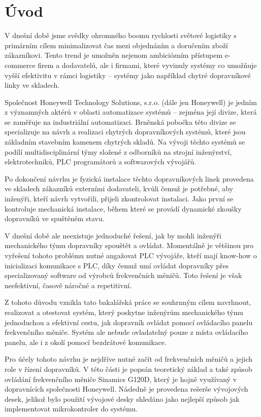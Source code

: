 \chapter*{Úvod}\label{chap:uvod}

V dnešní době jsme svědky ohromného boomu rychlosti světové logistiky s primárním cílem minimalizovat čas mezi objednáním a doručením zboží zákazníkovi. Tento trend je umožněn nejenom ambiciózním přístupem e-commerce firem a dodavatelů, ale i firmami, které vyvinuly systémy co umožňuje vyšší efektivitu v rámci logistiky – systémy jako například chytré dopravníkové linky ve skladech.

Společnost Honeywell Technology Solutions, s.r.o. (dále jen Honeywell) je jedním z významných aktérů v oblasti automatizace systémů – zejména její divize, která se zaměřuje na industriální automatizaci. Brněnská pobočka této divize se specializuje na návrh a realizaci chytrých dopravníkových systémů, které jsou základním stavebním kamenem chytrých skladů. Na vývoji těchto systémů se podílí multidisciplinární týmy složené z odborníků na strojní inženýrství, elektrotechniků, PLC programátorů a softwarových vývojářů.

Po dokončení návrhu je fyzická instalace těchto dopravníkových linek provedena ve skladech zákazníků externími dodavateli, kvůli čemuž je potřebné, aby inženýři, kteří návrh vytvořili, přijeli zkontrolovat instalaci. Jako první se kontroluje mechanická instalace, během které se provádí dynamické zkoušky dopravníků ve spuštěném stavu.

V dnešní době ale neexistuje jednoduché řešení, jak by mohli inženýři mechanického týmu dopravníky spouštět a ovládat. Momentálně je většinou pro vyřešení tohoto problému nutné angažovat PLC vývojáře, kteří mají know-how o inicializaci komunikace s PLC, díky čemuž umí ovládat dopravníky přes specializovaný software od výrobců frekvenčních měničů. Toto řešení je však neefektivní, časově náročné a repetitivní.

Z tohoto důvodu vznikla tato bakalářská práce se souhrnným cílem navrhnout, realizovat a otestovat systém, který poskytne inženýrům mechanického týmu jednoduchou a efektivní cestu, jak dopravník ovládat pomocí ovládacího panelu frekvenčního měniče. Systém ale nebude ovladatelný pouze z místa ovládacího panelu, ale i z okolí pomocí bezdrátové komunikace.

Pro účely tohoto návrhu je nejdříve nutné začít od frekvenčních měničů a jejich role v řízení dopravníků. V této části je popsán teoretický základ a také způsob ovládání frekvenčního měniče Sinamics G120D, který je hojně využívaný v dopravnících společnosti Honeywell. Následně je provedena rešerše vývojových desek, jelikož bylo použití vývojové desky shledáno jako nejlepší způsob jak implementovat mikrokontroler do systému.


